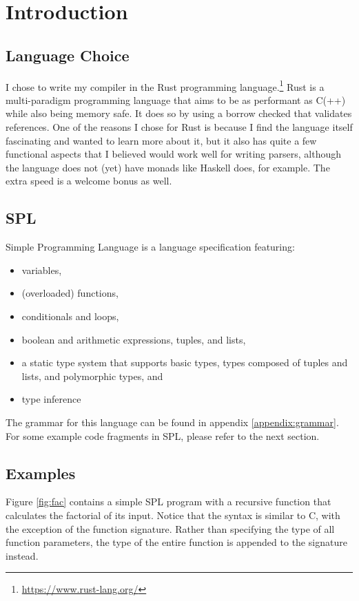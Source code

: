 \chapter{Introduction}

\section{Language Choice}
I chose to write my compiler in the Rust programming language.\footnote{\url{https://www.rust-lang.org/}} Rust is a multi-paradigm programming language that aims to be as performant as C(++) while also being memory safe. It does so by using a borrow checked that validates references. One of the reasons I chose for Rust is because I find the language itself fascinating and wanted to learn more about it, but it also has quite a few functional aspects that I believed would work well for writing parsers, although the language does not (yet) have monads like Haskell does, for example. The extra speed is a welcome bonus as well.

\section{SPL}
Simple Programming Language is a language specification featuring:

\begin{itemize}
    \item variables,
    \item (overloaded) functions,
    \item conditionals and loops,
    \item boolean and arithmetic expressions, tuples, and lists,
    \item a static type system that supports basic types, types composed of tuples and lists, and polymorphic types, and
    \item type inference
\end{itemize}

The grammar for this language can be found in appendix \ref{appendix:grammar}. For some example code fragments in SPL, please refer to the next section.

\section{Examples}
Figure \ref{fig:fac} contains a simple SPL program with a recursive function that calculates the factorial of its input. Notice that the syntax is similar to C, with the exception of the function signature. Rather than specifying the type of all function parameters, the type of the entire function is appended to the signature instead.

